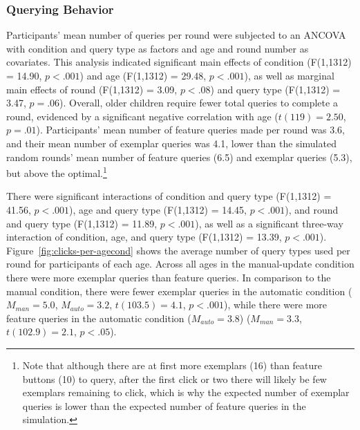 \documentclass[10pt,letterpaper]{article}
\begin{document}
\subsubsection{Querying Behavior}

Participants' mean number of queries per round were subjected to an 
ANCOVA with condition and query type as factors and age and round number as 
covariates. This analysis indicated significant main effects of condition (F(1,1312) = 
14.90, $p<.001$) and age (F(1,1312) = 29.48, $p<.001$), as well as marginal main 
effects of round (F(1,1312) = 3.09, $p<.08$) and query type (F(1,1312) = 3.47, $p=.
06$). Overall, older children require fewer total queries to complete a round, 
evidenced by a significant negative correlation with age ($t(119) = 2.50$, $p=.01$). 
Participants' mean number of feature queries made per round was 3.6, and their 
mean number of exemplar queries was 4.1, lower than the simulated random 
rounds' mean number of feature queries (6.5) and exemplar queries (5.3), but above 
the optimal.\footnote{Note that although there are at first more exemplars (16) than 
feature buttons (10) to query, after the first click or two there will likely be few 
exemplars remaining to click, which is why the expected number of exemplar 
queries is lower than the expected number of feature queries in the simulation.} 

There were significant interactions of condition and query type (F(1,1312) = 41.56, 
$p<.001$), age and query type (F(1,1312) = 14.45, $p<.001$), and round and query 
type (F(1,1312) = 11.89, $p<.001$), as well as a significant three-way interaction of 
condition, age, and query type (F(1,1312) = 13.39, $p<.001$). Figure~\ref{fig:clicks-per-agecond} 
shows the average number of query types used per round for 
participants of each age. Across all ages in the manual-update condition there were 
more exemplar queries than feature queries. In comparison to the manual condition, 
there were fewer exemplar queries in the automatic condition ($M_{man} = 5.0$, 
$M_{auto} = 3.2$, $t(103.5)=4.1$, $p<.001$), while there were more feature queries 
in the automatic condition ($M_{auto} = 3.8$) ($M_{man} = 3.3$, $t(102.9)=2.1$, 
$p<.05$). 
\end{document}
